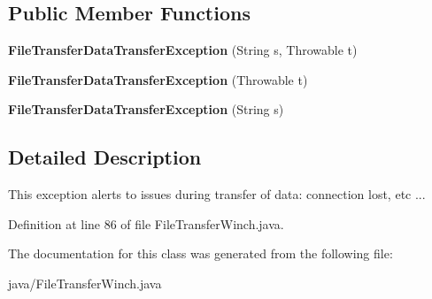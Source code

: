 \subsection*{Public Member Functions}
\begin{DoxyCompactItemize}
\item 
{\bfseries File\-Transfer\-Data\-Transfer\-Exception} (String s, Throwable t)\label{classorg_1_1smallfoot_1_1filexfer_1_1FileTransferWinch_1_1FileTransferDataTransferException_a7eebb8f05696cd7cfd131b36ca392895}

\item 
{\bfseries File\-Transfer\-Data\-Transfer\-Exception} (Throwable t)\label{classorg_1_1smallfoot_1_1filexfer_1_1FileTransferWinch_1_1FileTransferDataTransferException_a730a4e8226d9a8b6cd43aa50687e854c}

\item 
{\bfseries File\-Transfer\-Data\-Transfer\-Exception} (String s)\label{classorg_1_1smallfoot_1_1filexfer_1_1FileTransferWinch_1_1FileTransferDataTransferException_a3609c8674a0be3d2ecc75870110a95ff}

\end{DoxyCompactItemize}


\subsection{Detailed Description}
This exception alerts to issues during transfer of data\-: connection lost, etc ... 



Definition at line 86 of file File\-Transfer\-Winch.\-java.



The documentation for this class was generated from the following file\-:\begin{DoxyCompactItemize}
\item 
java/File\-Transfer\-Winch.\-java\end{DoxyCompactItemize}
